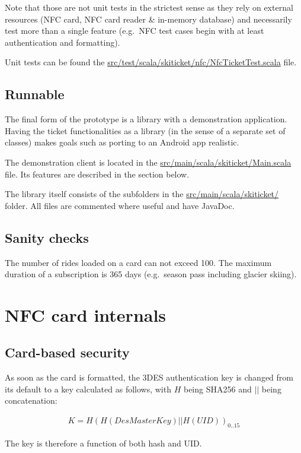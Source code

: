 \documentclass[paper=a4, fontsize=11pt]{scrartcl}
\begin{document}
Note that those are not unit tests in the strictest sense as they rely on
external resources (NFC card, NFC card reader \& in-memory database) and
necessarily test more than a single feature (e.g.\ NFC test cases begin with at
least authentication and formatting).

Unit tests can be found the 
\url{src/test/scala/skiticket/nfc/NfcTicketTest.scala} file.

\subsection{Runnable}

The final form of the prototype is a library with a demonstration application.
Having the ticket functionalities as a library (in the sense of a separate set
of classes) makes goals such as porting to an Android app realistic.

The demonstration client is located in the 
\url{src/main/scala/skiticket/Main.scala} file.
Its features are described in the section below.

The library itself consists of the subfolders in the
\url{src/main/scala/skiticket/} folder.
All files are commented where useful and have JavaDoc.

\subsection{Sanity checks}

The number of rides loaded on a card can not exceed 100.
The maximum duration of a subscription is 365 days (e.g.\ season pass including
glacier skiing).

\section{NFC card internals}

\subsection{Card-based security}

As soon as the card is formatted, the 3DES authentication key is changed from
its default to a key calculated as follows, with $H$ being SHA256 and $||$ being
concatenation:

\begin{align*}
    K = H{(H(DesMasterKey) || H(UID))}_{0..15}
\end{align*}

The key is therefore a function of both hash and UID\@.
\end{document}
